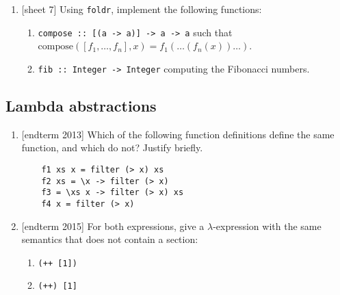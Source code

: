 \documentclass{article}
\begin{document}
\begin{enumerate}
\item {[sheet 7]} Using \verb|foldr|, implement the following functions:
\begin{enumerate}
\item \verb|compose :: [(a -> a)] -> a -> a| such that $\text{compose}([f_1, \dots, f_n], x) = f_1(\dots(f_n(x))\dots)$.
\item \verb|fib :: Integer -> Integer| computing the Fibonacci numbers.
\end{enumerate}
\end{enumerate}

\subsection{Lambda abstractions}
\begin{enumerate}
\item {[endterm 2013]} Which of the following function definitions define the same function, and which do not? Justify briefly.
\begin{verbatim}
    f1 xs x = filter (> x) xs
    f2 xs = \x -> filter (> x)
    f3 = \xs x -> filter (> x) xs
    f4 x = filter (> x)
\end{verbatim}

\item {[endterm 2015]} For both expressions, give a $\lambda$-expression with the same semantics that does not contain a section:
\begin{enumerate}
\item \verb|(++ [1])|
\item \verb|(++) [1]|
\end{enumerate}
\end{enumerate}
\end{document}
